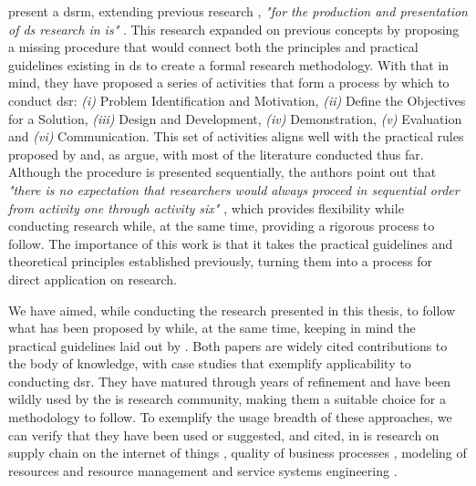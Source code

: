 \citeauthor{peffers_design_2007} \cite{peffers_design_2007} present a \gls{dsrm}, extending previous research \cite{march_design_1995, hevner_design_2004}, \textit{"for the production and presentation of \gls{ds} research in \gls{is}"} \cite[3]{peffers_design_2007}. This research expanded on previous concepts by proposing a missing procedure \cite[7]{peffers_design_2007} that would connect both the principles and practical guidelines existing in \gls{ds} to create a formal research methodology. With that in mind, they have proposed a series of activities that form a process by which to conduct \gls{dsr}: \emph{(i)} Problem Identification and Motivation, \emph{(ii)} Define the Objectives for a Solution, \emph{(iii)} Design and Development, \emph{(iv)} Demonstration, \emph{(v)} Evaluation and \emph{(vi)} Communication. This set of activities aligns well with the practical rules proposed by \citeauthor{hevner_design_2004} \cite{hevner_design_2004} and, as \citeauthor{peffers_design_2007} argue, with most of the literature conducted thus far. Although the procedure is presented sequentially, the authors point out that \textit{"there is no expectation that researchers would always proceed in sequential order from activity one through activity six"} \cite[14]{peffers_design_2007}, which provides flexibility while conducting research while, at the same time, providing a rigorous process to follow. The importance of this work is that it takes the practical guidelines and theoretical principles established previously, turning them into a process for direct application on research.

We have aimed, while conducting the research presented in this thesis, to follow what has been proposed by \citeauthor{peffers_design_2007} \cite{peffers_design_2007} while, at the same time, keeping in mind the practical guidelines laid out by \citeauthor{hevner_design_2004} \cite{hevner_design_2004}. Both papers are widely cited contributions to the body of knowledge, with case studies that exemplify applicability to conducting \gls{dsr}. They have matured through years of refinement and have been wildly used by the \gls{is} research community, making them a suitable choice for a methodology to follow. To exemplify the usage breadth of these approaches, we can verify that they have been used or suggested, and cited, in \gls{is} research on supply chain on the internet of things \cite{geerts_supply_2014}, quality of business processes \cite{heidari_quality_2014}, modeling of resources and resource management \cite{speitkamp_mathematical_2010} and service systems engineering \cite{bohmann_service_2014}.


